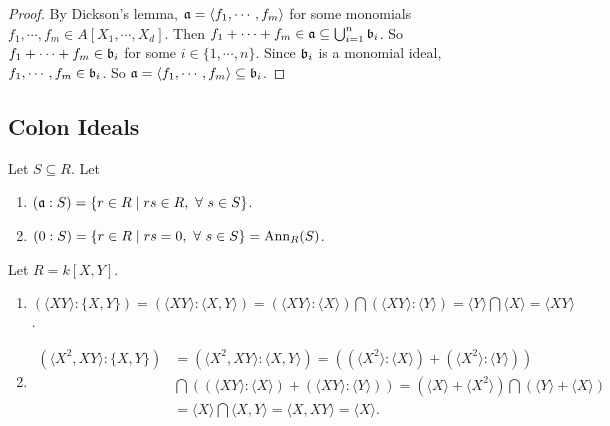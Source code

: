 \begin{proof}
     By Dickson's lemma, $\mathfrak{a} = \langle f_1,\cdots,f_m \rangle$ for some monomials $f_1,\cdots,f_m \in A[X_1,\cdots,X_d]$. Then $f_1 + \cdots + f_m \in \mathfrak{a} \subseteq \bigcup_{i=1}^n \mathfrak{b}_i$. So $f_1 + \cdots + f_m \in \mathfrak{b}_i$ for some $i \in \{1,\cdots,n\}$. Since $\mathfrak{b}_i$ is a monomial ideal, $f_1,\cdots,f_m \in \mathfrak{b}_i$. So $\mathfrak{a} = \langle f_1,\cdots,f_m \rangle \subseteq \mathfrak{b}_i$.
\end{proof}


\subsection*{Colon Ideals}

\begin{definition}
    Let $S \subseteq R$. Let 
    \begin{enumerate}
        \item 
            $(\mathfrak{a}:S) = \{r \in R \mid rs \in R, \ \forall \  s \in S\}$.
        \item
            $(0:S) = \{r \in R \mid rs = 0, \ \forall \  s \in S\} = \operatorname{Ann}_R(S)$.
    \end{enumerate}
\end{definition}

\begin{example}
    Let $R = k[X,Y]$. 
    \begin{enumerate}
        \item $(\langle XY \rangle: \{X,Y\}) = (\langle XY \rangle: \langle X,Y \rangle) = (\langle XY \rangle: \langle X \rangle) \bigcap (\langle XY \rangle: \langle Y \rangle) = \langle Y \rangle \bigcap \langle X \rangle= \langle XY \rangle$.
        \item
            \begin{align*}
                (\langle X^2,XY \rangle: \{X,Y\}) &= (\langle X^2,XY \rangle: \langle X,Y \rangle) = \left((\langle X^2 \rangle: \langle X \rangle) + (\langle X^2 \rangle: \langle Y \rangle)\right) \\
                &\textstyle \bigcap\left((\langle XY \rangle: \langle X \rangle)+(\langle XY \rangle: \langle Y \rangle)\right) = (\langle X \rangle + \langle X^2 \rangle) \textstyle \bigcap (\langle Y \rangle + \langle X \rangle) \\
                &= \langle X \rangle \textstyle \bigcap \langle X,Y \rangle = \langle X,XY \rangle = \langle X \rangle.
            \end{align*}
    \end{enumerate}
\end{example}


